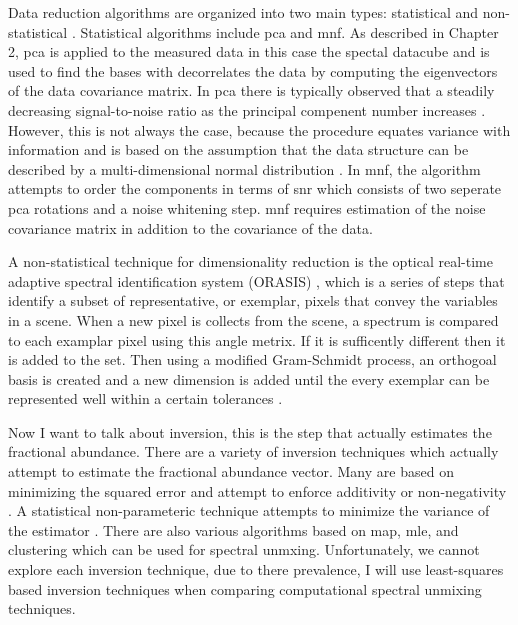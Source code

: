 Data reduction algorithms are organized into two main types: statistical and non-statistical \cite{keshava2003survey}. Statistical algorithms include \acrfull{pca} and \acrfull{mnf}. As described in Chapter 2, \gls{pca} is applied to the measured  data in this case the spectal datacube and is used to find the bases with decorrelates the data by computing the eigenvectors of the data covariance matrix. In \gls{pca} there is typically observed that a steadily decreasing signal-to-noise ratio as the principal compenent number increases \cite{green1988transformation}. However, this is not always the case, because the procedure equates variance with information and is based on the assumption that the data structure can be described by a multi-dimensional normal distribution \cite{philpot2015mnf}. In \gls{mnf}, the algorithm attempts to order the components in terms of \gls{snr} which consists of two seperate \gls{pca} rotations and a noise whitening step. \gls{mnf} requires estimation of the noise covariance matrix in addition to the covariance of the data.

A non-statistical technique for dimensionality reduction is the optical real-time adaptive spectral identification system (ORASIS) \cite{bowles2007optical}, which is a series of steps that identify a subset of representative, or exemplar, pixels that convey the variables in a scene. When a new pixel is collects from the scene, a spectrum is compared to each examplar pixel using this angle metrix. If it is sufficently different then it is added to the set. Then using a modified Gram-Schmidt process, an orthogoal basis is created and a new dimension is added until the every exemplar can be represented well within a certain tolerances \cite{keshava2003survey}. 


Now I want to talk about inversion, this is the step that actually estimates the \gls{fractional abundance}. There are a variety of inversion techniques which actually attempt to estimate the fractional abundance vector. Many are based on minimizing the squared error and attempt to enforce additivity or non-negativity \cite{keshava2003survey, lawson1995solving}. A statistical non-parameteric technique attempts to minimize the variance of the estimator \cite{steven1993fundamentals}. There are also various algorithms based on \acrfull{map}, \acrfull{mle}, and clustering which can be used for spectral unmxing. Unfortunately, we cannot explore each inversion technique, due to there prevalence, I will use least-squares based inversion techniques when comparing computational spectral unmixing techniques. 


